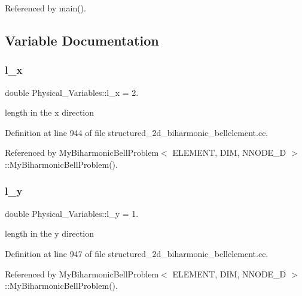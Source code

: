 Referenced by main().



\subsection{Variable Documentation}
\mbox{\label{namespacePhysical__Variables_af92161eeeab3e15a31698af80f8d09db}} 
\subsubsection{\texorpdfstring{l\+\_\+x}{l\_x}}
{\footnotesize\ttfamily double Physical\+\_\+\+Variables\+::l\+\_\+x = 2.}



length in the x direction 



Definition at line 944 of file structured\+\_\+2d\+\_\+biharmonic\+\_\+bellelement.\+cc.



Referenced by My\+Biharmonic\+Bell\+Problem$<$ E\+L\+E\+M\+E\+N\+T, D\+I\+M, N\+N\+O\+D\+E\+\_\+D $>$\+::\+My\+Biharmonic\+Bell\+Problem().

\mbox{\label{namespacePhysical__Variables_a9f73110ebbfe999c6f09ac797793a537}} 
\subsubsection{\texorpdfstring{l\+\_\+y}{l\_y}}
{\footnotesize\ttfamily double Physical\+\_\+\+Variables\+::l\+\_\+y = 1.}



length in the y direction 



Definition at line 947 of file structured\+\_\+2d\+\_\+biharmonic\+\_\+bellelement.\+cc.



Referenced by My\+Biharmonic\+Bell\+Problem$<$ E\+L\+E\+M\+E\+N\+T, D\+I\+M, N\+N\+O\+D\+E\+\_\+D $>$\+::\+My\+Biharmonic\+Bell\+Problem().


